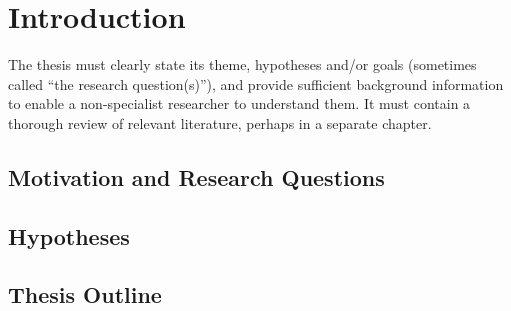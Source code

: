 \chapter{Introduction}
\label{introduction}

The thesis must clearly state its theme, hypotheses and/or goals (sometimes called “the research question(s)”), and provide sufficient background information to enable a non-specialist researcher to understand them. It must contain a thorough review of relevant literature, perhaps in a separate chapter.

\section{Motivation and Research Questions}

\section{Hypotheses}

\section{Thesis Outline}